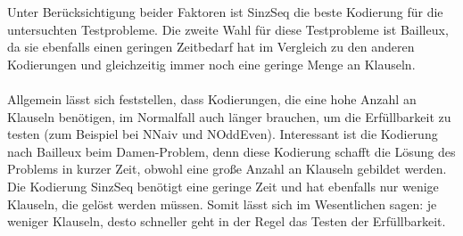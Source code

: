 \documentclass[a4,abstract=on]{scrartcl}
\begin{document}
Unter Berücksichtigung beider Faktoren ist SinzSeq die beste Kodierung für die untersuchten Testprobleme. Die zweite Wahl für diese Testprobleme ist Bailleux, da sie ebenfalls einen geringen Zeitbedarf hat im Vergleich zu den anderen Kodierungen und gleichzeitig immer noch eine geringe Menge an Klauseln.\\
\ \\
Allgemein lässt sich feststellen, dass Kodierungen, die eine hohe Anzahl an Klauseln benötigen, im Normalfall auch länger brauchen, um die Erfüllbarkeit zu testen (zum Beispiel bei NNaiv und NOddEven). Interessant ist die Kodierung nach Bailleux beim Damen-Problem, denn diese Kodierung schafft die Lösung des Problems in kurzer Zeit, obwohl eine große Anzahl an Klauseln gebildet werden. Die Kodierung SinzSeq benötigt eine geringe Zeit und hat ebenfalls nur wenige Klauseln, die gelöst werden müssen. Somit lässt sich im Wesentlichen sagen: je weniger Klauseln, desto schneller geht in der Regel das Testen der Erfüllbarkeit. 
\end{document}
